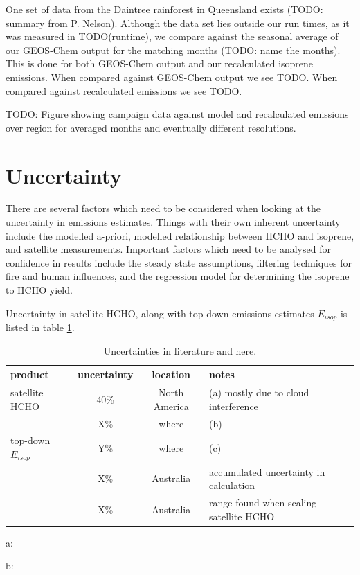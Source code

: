     One set of data from the Daintree rainforest in Queensland exists (TODO: summary from P. Nelson).
    Although the data set lies outside our run times, as it was measured in TODO(runtime), we compare against the seasonal average of our GEOS-Chem output for the matching months (TODO: name the months).
    This is done for both GEOS-Chem output and our recalculated isoprene emissions.
    When compared against GEOS-Chem output we see TODO.
    When compared against recalculated emissions we see TODO.
    
    TODO: Figure showing campaign data against model and recalculated emissions over region for averaged months and eventually different resolutions.
    
\section{Uncertainty}
\label{BioIsop:Uncertainty}

  There are several factors which need to be considered when looking at the uncertainty in emissions estimates.
  Things with their own inherent uncertainty include the modelled a-priori, modelled relationship between HCHO and isoprene, and satellite measurements. 
  Important factors which need to be analysed for confidence in results include the steady state assumptions, filtering techniques for fire and human influences, and the regression model for determining the isoprene to HCHO yield.
  
  Uncertainty in satellite HCHO, along with top down emissions estimates $E_{isop}$ is listed in table \ref{Model:Uncertainty:tab_uncertainties}.
  \begin{table}\begin{threeparttable}
    \caption{Uncertainties in literature and here.}
    \begin{tabular}{ l | c  c  l } 
      \toprule
      product & uncertainty & location & notes \\
      \midrule
      satellite HCHO & 40\% & North America & (a) mostly due to cloud interference \\
       & X\% & where & (b) \\
      top-down $E_{isop}$ & Y\% & where & (c) \\
       & X\% & Australia & accumulated uncertainty in calculation \\
       & X\% & Australia & range found when scaling satellite HCHO \\
      \bottomrule
    \end{tabular}
    \begin{tablenotes} 
      \item a: \textcite{Millet2006,Palmer2006}
      \item b: 
    \end{tablenotes}
    \label{Model:Uncertainty:tab_uncertainties}
  \end{threeparttable}\end{table}
  
